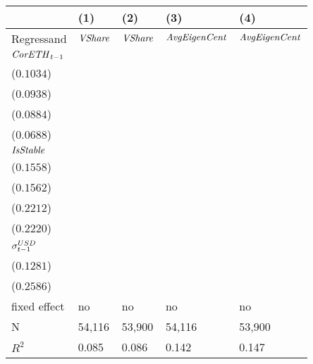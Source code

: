 \begin{tabular}{lllll}
\toprule
{} &                                      (1) &                                      (2) &                                      (3) &                                      (4) \\
\midrule
Regressand                 &                           ${\it VShare}$ &                           ${\it VShare}$ &                     ${\it AvgEigenCent}$ &                     ${\it AvgEigenCent}$ \\
${\it CorETH}_{t-1}$       &  \makecell{$0.0365^{***}$ \\ ($0.1034$)} &  \makecell{$0.0331^{***}$ \\ ($0.0938$)} &  \makecell{$0.0576^{***}$ \\ ($0.0884$)} &  \makecell{$0.0449^{***}$ \\ ($0.0688$)} \\
${\it IsStable}$           &  \makecell{$0.0478^{***}$ \\ ($0.1558$)} &  \makecell{$0.0480^{***}$ \\ ($0.1562$)} &  \makecell{$0.1254^{***}$ \\ ($0.2212$)} &  \makecell{$0.1258^{***}$ \\ ($0.2220$)} \\
${\it \sigma}^{USD}_{t-1}$ &                              \makecell{} &  \makecell{$0.0207^{***}$ \\ ($0.1281$)} &                              \makecell{} &  \makecell{$0.0772^{***}$ \\ ($0.2586$)} \\
\midrule fixed effect      &                                       no &                                       no &                                       no &                                       no \\
N                          &                                   54,116 &                                   53,900 &                                   54,116 &                                   53,900 \\
$R^2$                      &                                    0.085 &                                    0.086 &                                    0.142 &                                    0.147 \\
\bottomrule
\end{tabular}
